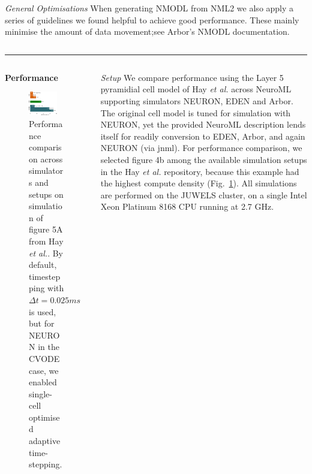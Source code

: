 \documentclass{beamer}
\begin{document}
\begin{frame}[t, fragile]
\begin{columns}[t]
\begin{column}{0.49\textwidth}
      \emph{General Optimisations} When generating NMODL from NML2 we also apply
      a series of guidelines we found helpful to achieve good performance. These
      mainly minimise the amount of data movement;\@ see Arbor's NMODL
      documentation.
    \end{column}
  \end{columns}
  \vspace*{1ex}
  \textcolor{arborange}{\rule{\textwidth}{0.5ex}}
  \vspace*{-1ex}
  \begin{columns}
    \begin{column}{0.42\textwidth}
      \textbf{Performance}
      \begin{figure}[h]
        \centering
        \includegraphics[width=0.8\textwidth]{./benchmark/barchart_cropped.pdf}
          \caption{Performance comparison across simulators and setups on
                   simulation of figure 5A from Hay \emph{et al.}.
                   By default, timestepping with $\Delta t = 0.025ms$
                   is used, but for NEURON in the CVODE case, we enabled
                   single-cell optimised adaptive time-stepping.}
        \label{fig:bar}
      \end{figure}
    \end{column}
    \begin{column}{0.42\textwidth}
        \emph{Setup}
        We compare performance using
            the Layer 5 pyramidial cell model of Hay \emph{et al.}
            across NeuroML supporting simulators NEURON, EDEN and Arbor.
        The original cell model is tuned for simulation with NEURON,
            yet the provided NeuroML description lends itself for
            readily conversion to EDEN, Arbor, and again NEURON (via jnml).
        For performance comparison,
            we selected figure 4b among the available simulation setups
            in the Hay \emph{et al.} repository,
            because this example had the highest compute density
            (Fig.~\ref{fig:bar}).
        All simulations are performed on the JUWELS cluster,
            on a single Intel Xeon Platinum 8168 CPU running at 2.7 GHz.


\end{column}
\end{columns}
\end{frame}
\end{document}
